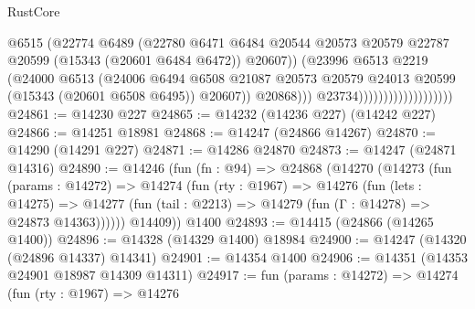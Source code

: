 \begin{lexlean}{RustCore}
\begin{coremodule}
                                              @6515
                                              (@22774
                                                @6489
                                                (@22780
                                                  @6471
                                                  @6484
                                                  @20544
                                                  @20573
                                                  @20579
                                                  @22787
                                                  @20599
                                                  (@15343 (@20601 @6484 @6472))
                                                  @20607))
                                              (@23996
                                                @6513
                                                @2219
                                                (@24000
                                                  @6513
                                                  (@24006
                                                    @6494
                                                    @6508
                                                    @21087
                                                    @20573
                                                    @20579
                                                    @24013
                                                    @20599
                                                    (@15343 (@20601 @6508 @6495))
                                                    @20607))
                                                @20868)))
                                          @23734)))))))))))))))))))
@24861 := @14230 @227
@24865 := @14232 (@14236 @227) (@14242 @227)
@24866 := @14251 @18981
@24868 := @14247 (@24866 @14267)
@24870 := @14290 (@14291 @227)
@24871 := @14286 @24870
@24873 := @14247 (@24871 @14316)
@24890 := @14246
    (fun (fn : @94) =>
    @24868
      (@14270
        (@14273
          (fun (params : @14272) =>
          @14274
            (fun (rty : @1967) =>
            @14276
              (fun (lets : @14275) =>
              @14277 (fun (tail : @2213) => @14279 (fun (Γ : @14278) => @24873 @14363))))))
        @14409))
    @1400
@24893 := @14415 (@24866 (@14265 @1400))
@24896 := @14328 (@14329 @1400) @18984
@24900 := @14247 (@14320 (@24896 @14337) @14341)
@24901 := @14354 @1400
@24906 := @14351 (@14353 @24901 @18987 @14309 @14311)
@24917 := fun (params : @14272) =>
  @14274
    (fun (rty : @1967) =>
    @14276

\end{coremodule}
\end{lexlean}

